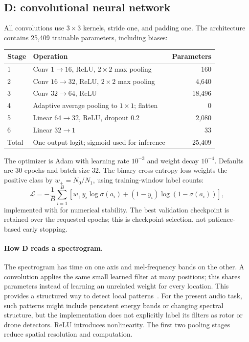 \documentclass[11pt,letterpaper]{article}
\newcommand{\code}[1]{\texttt{\detokenize{#1}}}
\begin{document}
\subsection{D: convolutional neural network}
All convolutions use $3\times3$ kernels, stride one, and padding one. The
architecture contains 25,409 trainable parameters, including biases:
\begin{center}
\small
\begin{tabularx}{\linewidth}{@{}lYr@{}}
\toprule
Stage & Operation & Parameters \\
 & Conv $1\rightarrow16$, ReLU, $2\times2$ max pooling & 160 \\
2 & Conv $16\rightarrow32$, ReLU, $2\times2$ max pooling & 4,640 \\
3 & Conv $32\rightarrow64$, ReLU & 18,496 \\
4 & Adaptive average pooling to $1\times1$; flatten & 0 \\
5 & Linear $64\rightarrow32$, ReLU, dropout 0.2 & 2,080 \\
6 & Linear $32\rightarrow1$ & 33 \\
\midrule
Total & One output logit; sigmoid used for inference & 25,409 \\
\bottomrule
\end{tabularx}
\end{center}
The optimizer is Adam with learning rate $10^{-3}$ and weight decay $10^{-4}$.
Defaults are 30 epochs and batch size 32. The binary cross-entropy loss weights
the positive class by $w_+=N_0/N_1$, using training-window label counts:
\begin{equation}
 \mathcal{L}=-\frac{1}{B}\sum_{i=1}^{B}
 \left[w_+y_i\log\sigma(a_i)+(1-y_i)\log(1-\sigma(a_i))\right],
\end{equation}
implemented with \code{BCEWithLogitsLoss} for numerical stability. The best
validation checkpoint is retained over the requested epochs; this is checkpoint
selection, not patience-based early stopping.

\paragraph{How D reads a spectrogram.}
The spectrogram has time on one axis and mel-frequency bands on the other.
A convolution applies the same small learned filter at many positions; this
shares parameters instead of learning an unrelated weight for every location.
This provides a structured way to detect local patterns~\cite{convbook}.
For the present audio task, such patterns might include persistent energy bands
or changing spectral structure, but the implementation does not explicitly
label its filters as rotor or drone detectors. ReLU introduces nonlinearity.
The first two pooling stages reduce spatial resolution and computation.
\end{document}
